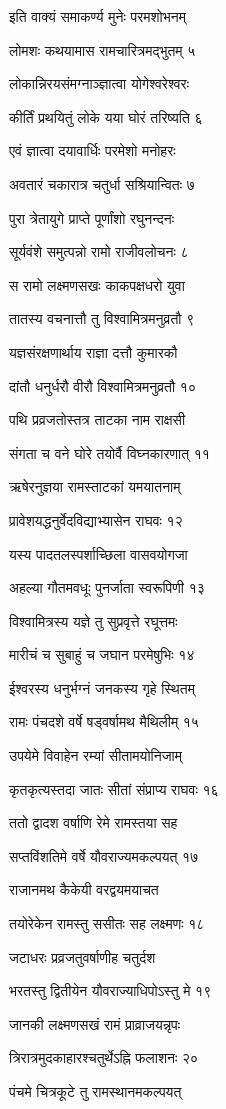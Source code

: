 इति वाक्यं समाकर्ण्य मुनेः परमशोभनम्

लोमशः कथयामास रामचारित्रमद्भुतम् ५

लोकान्निरयसंमग्नाञ्ज्ञात्वा योगेश्वरेश्वरः

कीर्तिं प्रथयितुं लोके यया घोरं तरिष्यति ६

एवं ज्ञात्वा दयावार्धिः परमेशो मनोहरः

अवतारं चकारात्र चतुर्धा सश्रियान्वितः ७

पुरा त्रेतायुगे प्राप्ते पूर्णांशो रघुनन्दनः

सूर्यवंशे समुत्पन्नो रामो राजीवलोचनः ८

स रामो लक्ष्मणसखः काकपक्षधरो युवा

तातस्य वचनात्तौ तु विश्वामित्रमनुव्रतौ ९

यज्ञसंरक्षणार्थाय राज्ञा दत्तौ कुमारकौ

दांतौ धनुर्धरौ वीरौ विश्वामित्रमनुव्रतौ १०

पथि प्रव्रजतोस्तत्र ताटका नाम राक्षसी

संगता च वने घोरे तयोर्वै विघ्नकारणात् ११

ऋषेरनुज्ञया रामस्ताटकां यमयातनाम्

प्रावेशयद्धनुर्वेदविद्याभ्यासेन राघवः १२

यस्य पादतलस्पर्शाच्छिला वासवयोगजा

अहल्या गौतमवधूः पुनर्जाता स्वरूपिणी १३

विश्वामित्रस्य यज्ञे तु सुप्रवृत्ते रघूत्तमः

मारीचं च सुबाहुं च जघान परमेषुभिः १४

ईश्वरस्य धनुर्भग्नं जनकस्य गृहे स्थितम्

रामः पंचदशे वर्षे षड्वर्षामथ मैथिलीम् १५

उपयेमे विवाहेन रम्यां सीतामयोनिजाम्

कृतकृत्यस्तदा जातः सीतां संप्राप्य राघवः १६

ततो द्वादश वर्षाणि रेमे रामस्तया सह

सप्तविंशतिमे वर्षे यौवराज्यमकल्पयत् १७

राजानमथ कैकेयी वरद्वयमयाचत

तयोरेकेन रामस्तु ससीतः सह लक्ष्मणः १८

जटाधरः प्रव्रजतुवर्षाणीह चतुर्दश

भरतस्तु द्वितीयेन यौवराज्याधिपोऽस्तु मे १९

जानकी लक्ष्मणसखं रामं प्राव्राजयन्नृपः

त्रिरात्रमुदकाहारश्चतुर्थेऽह्नि फलाशनः २०

पंचमे चित्रकूटे तु रामस्थानमकल्पयत्


